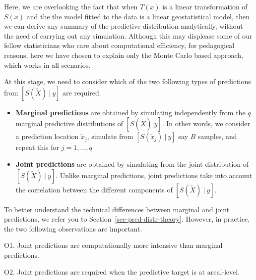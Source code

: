 \documentclass[
  letterpaper,
]{krantz}
\begin{document}
\begin{tcolorbox}[enhanced jigsaw, leftrule=.75mm, rightrule=.15mm, breakable, opacityback=0, coltitle=black, toprule=.15mm, toptitle=1mm, colbacktitle=quarto-callout-note-color!10!white, bottomrule=.15mm, opacitybacktitle=0.6, arc=.35mm, colback=white, title=\textcolor{quarto-callout-note-color}{\faInfo}\hspace{0.5em}{Note}, colframe=quarto-callout-note-color-frame, titlerule=0mm, bottomtitle=1mm, left=2mm]

Here, we are overlooking the fact that when \(T(x)\) is a linear
transformation of \(S(x)\) and the the model fitted to the data is a
linear geostatistical model, then we can derive any summary of the
predictive distribution analytically, without the need of carrying out
any simulation. Although this may displease some of our fellow
statisticians who care about computational efficiency, for pedagogical
reasons, here we have chosen to explain only the Monte Carlo based
approach, which works in all scenarios.

\end{tcolorbox}

At this stage, we need to consider which of the two following types of
predictions from \([S(\tilde{X}) \: |\: y]\) are required.

\begin{itemize}
\item
  \textbf{Marginal predictions} are obtained by simulating independently
  from the \(q\) marginal predictive distributions of
  \([S(\tilde{X}) | y]\). In other words, we consider a prediction
  location \(\tilde{x}_j\), simulate from \([S(\tilde{x}_j) \: |\: y]\)
  say \(B\) samples, and repeat this for \(j=1,\ldots,q\)
\item
  \textbf{Joint predictions} are obtained by simulating from the joint
  distribution of \([S(\tilde{X}) \: |\: y]\). Unlike marginal
  predictions, joint predictions take into account the correlation
  between the different components of \([S(\tilde{X}) \: |\: y]\).
\end{itemize}

To better understand the technical differences between marginal and
joint predictions, we refer you to Section~\ref{sec-pred-distr-theory}.
However, in practice, the two following observations are important.

O1. Joint predictions are computationally more intensive than marginal
predictions.

O2. Joint predictions are required when the predictive target is at
areal-level.
\end{document}
